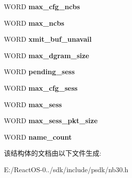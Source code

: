 \begin{DoxyCompactItemize}
\item 
\mbox{\label{struct___a_d_a_p_t_e_r___s_t_a_t_u_s_a9efc447a524e29ef4edbbad31cebd2d6}} 
W\+O\+RD {\bfseries max\+\_\+cfg\+\_\+ncbs}
\item 
\mbox{\label{struct___a_d_a_p_t_e_r___s_t_a_t_u_s_a94e96db9b869e5c731cc81dc3e57fb56}} 
W\+O\+RD {\bfseries max\+\_\+ncbs}
\item 
\mbox{\label{struct___a_d_a_p_t_e_r___s_t_a_t_u_s_a9eb4103047f78542c55338acf838f867}} 
W\+O\+RD {\bfseries xmit\+\_\+buf\+\_\+unavail}
\item 
\mbox{\label{struct___a_d_a_p_t_e_r___s_t_a_t_u_s_a9ce4e4b9cefb5d60416130c8ac1980d6}} 
W\+O\+RD {\bfseries max\+\_\+dgram\+\_\+size}
\item 
\mbox{\label{struct___a_d_a_p_t_e_r___s_t_a_t_u_s_a92d9c20344bbef01f96b4f470a53b430}} 
W\+O\+RD {\bfseries pending\+\_\+sess}
\item 
\mbox{\label{struct___a_d_a_p_t_e_r___s_t_a_t_u_s_abb95912640775d6714b59b33a5ca2a44}} 
W\+O\+RD {\bfseries max\+\_\+cfg\+\_\+sess}
\item 
\mbox{\label{struct___a_d_a_p_t_e_r___s_t_a_t_u_s_a07331f8d36f71a688c15af6d33f19fdf}} 
W\+O\+RD {\bfseries max\+\_\+sess}
\item 
\mbox{\label{struct___a_d_a_p_t_e_r___s_t_a_t_u_s_ab070a65af0141abe438711fa93219185}} 
W\+O\+RD {\bfseries max\+\_\+sess\+\_\+pkt\+\_\+size}
\item 
\mbox{\label{struct___a_d_a_p_t_e_r___s_t_a_t_u_s_a21cf11b8d29052213487726111258d29}} 
W\+O\+RD {\bfseries name\+\_\+count}
\end{DoxyCompactItemize}


该结构体的文档由以下文件生成\+:\begin{DoxyCompactItemize}
\item 
E\+:/\+React\+O\+S-\/0../sdk/include/psdk/nb30.\+h\end{DoxyCompactItemize}
